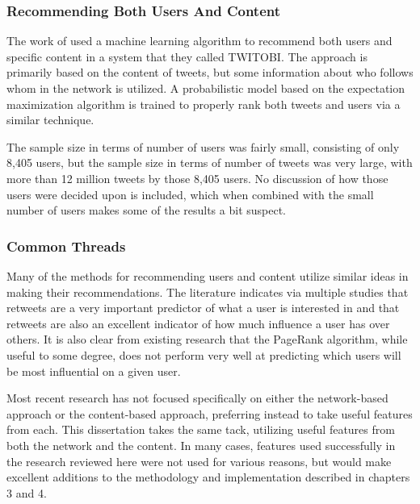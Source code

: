 \subsubsection{Recommending Both Users And Content}

The work of \cite{Kim2011} used a machine learning algorithm to recommend both users and specific content in a system that they called TWITOBI. The approach is primarily based on the content of tweets, but some information about who follows whom in the network is utilized. A probabilistic model based on the expectation maximization algorithm is trained to properly rank both tweets and users via a similar technique. 

The sample size in terms of number of users was fairly small, consisting of only 8,405 users, but the sample size in terms of number of tweets was very large, with more than 12 million tweets by those 8,405 users. No discussion of how those users were decided upon is included, which when combined with the small number of users makes some of the results a bit suspect.

\subsubsection{Common Threads}

Many of the methods for recommending users and content utilize similar ideas in making their recommendations. The literature indicates via multiple studies that retweets are a very important predictor of what a user is interested in and that retweets are also an excellent indicator of how much influence a user has over others. It is also clear from existing research that the PageRank algorithm, while useful to some degree, does not perform very well at predicting which users will be most influential on a given user.

Most recent research has not focused specifically on either the network-based approach or the content-based approach, preferring instead to take useful features from each. This dissertation takes the same tack, utilizing useful features from both the network and the content. In many cases, features used successfully in the research reviewed here were not used for various reasons, but would make excellent additions to the methodology and implementation described in chapters 3 and 4.




